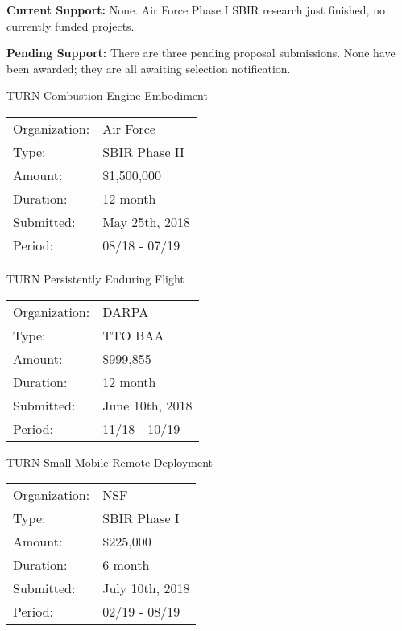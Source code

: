 \documentclass[11pt]{article}
\begin{document}

{\bf Current Support:} None.  Air Force Phase I SBIR research just finished, no currently funded projects.

{\bf Pending Support:} There are three pending proposal submissions.  None have been awarded; they are all awaiting selection notification.

TURN Combustion Engine Embodiment  \\
\begin{tabular}{ll}
Organization: & Air Force        \\
Type:         & SBIR Phase II    \\
Amount:       & \$1,500,000      \\
Duration:     & 12 month         \\
Submitted:    & May 25th, 2018   \\
Period:       & 08/18 - 07/19    \\
\end{tabular}

TURN Persistently Enduring Flight  \\
\begin{tabular}{ll}
Organization: & DARPA            \\
Type:         & TTO BAA          \\
Amount:       & \$999,855        \\
Duration:     & 12 month         \\
Submitted:    & June 10th, 2018  \\
Period:       & 11/18 - 10/19    \\
\end{tabular}

TURN Small Mobile Remote Deployment  \\
\begin{tabular}{ll}
Organization: & NSF              \\
Type:         & SBIR Phase I     \\
Amount:       & \$225,000        \\
Duration:     & 6 month          \\
Submitted:    & July 10th, 2018  \\
Period:       & 02/19 - 08/19    \\
\end{tabular}
\end{document}
